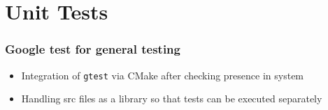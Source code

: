 \section{Unit Tests}

\begin{frame}
    \frametitle{Google test for general testing}

    \begin{itemize}
        \item Integration of \verb|gtest| via CMake after checking presence in system
        \item Handling src files as a library so that tests can be executed separately
    \end{itemize}

\end{frame}